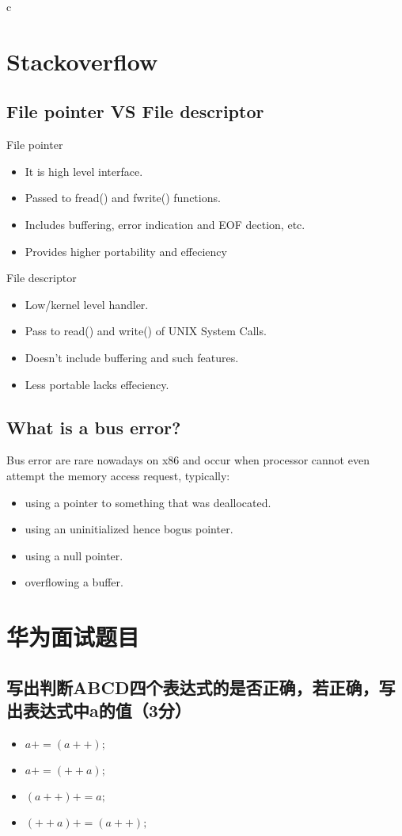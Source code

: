 \documentclass{article}
\begin{document}
\begin{mitned}{c}
\section{Stackoverflow}
\subsection{File pointer VS File descriptor}
\textsf{File pointer}
\begin{itemize}
\item[(A)] It is high level interface.
\item[(B)] Passed to fread() and fwrite() functions.
\item[(C)] Includes buffering, error indication and EOF dection, etc.
\item[(D)] Provides higher portability and effeciency
\end{itemize}

\textsf{File descriptor}
\begin{itemize}
\item[(A)] Low/kernel level handler.
\item[(B)] Pass to read() and write() of UNIX System Calls.
\item[(C)] Doesn't include buffering and such features.
\item[(D)] Less portable lacks effeciency.
\end{itemize}


\subsection{What is a bus error?}
Bus error are rare nowadays on x86 and occur when processor cannot even 
attempt the memory access request, typically:
\begin{itemize}
\item using a pointer to something that was deallocated.
\item using an uninitialized hence bogus pointer.
\item using a null pointer.
\item overflowing a buffer.
\end{itemize}
\section{华为面试题目}
\subsection{写出判断ABCD四个表达式的是否正确，若正确，写出表达式中a的值（3分）}
\begin{itemize}
\item[(A)] $a += (a++);$
\item[(B)] $a += (++a);$
\item[(C)] $(a++) += a;$
\item[(D)] $(++a) += (a++);$
\end{itemize}


\end{mitned}
\end{document}
